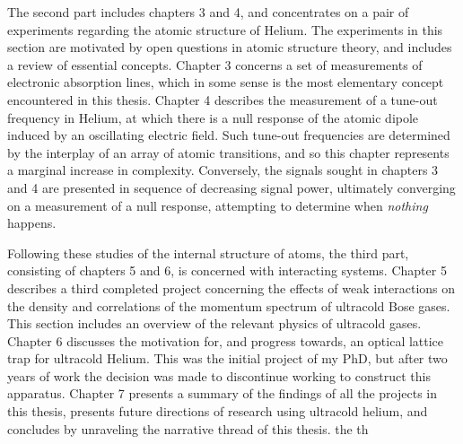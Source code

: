 	The second part includes chapters 3 and 4, and concentrates on a pair of
	experiments regarding the atomic structure of Helium.
		The experiments in
	this section are motivated by open questions in atomic structure theory,
	and includes a review of essential concepts.
		Chapter 3 concerns a set of
	measurements of electronic absorption lines, which in some sense is the
	most elementary concept encountered in this thesis.
		Chapter 4 describes
	the measurement of a tune-out frequency in Helium, at which there is a
	null response of the atomic dipole induced by an oscillating electric
	field.
		Such tune-out frequencies are determined by the interplay of an
	array of atomic transitions, and so this chapter represents a marginal
	increase in complexity.
		Conversely, the signals sought in chapters 3 and
	4 are presented in sequence of decreasing signal power, ultimately
	converging on a measurement of a null response, attempting to determine
	when \emph{nothing} happens.

	Following these studies of the internal structure of atoms, the third
	part, consisting of chapters 5 and 6, is concerned with interacting
	systems.
		Chapter 5 describes a third completed project concerning the
	effects of weak interactions on the density and correlations of the
	momentum spectrum of ultracold Bose gases.
		This section includes an
	overview of the relevant physics of ultracold gases.
		Chapter 6 discusses
	the motivation for, and progress towards, an optical lattice trap for
	ultracold Helium.
		This was the initial project of my PhD, but after two
	years of work the decision was made to discontinue working to construct
	this apparatus.
		Chapter 7 presents a summary of the findings of all the
	projects in this thesis, presents future directions of research using
	ultracold helium, and concludes by unraveling the narrative thread of
	this thesis.
	the th





